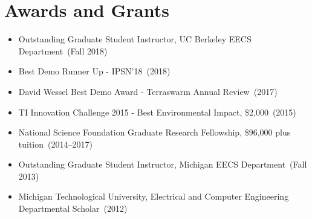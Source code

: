 \documentclass{article}
\begin{document}



\section*{Awards and Grants}
\vspace{-6pt}
\begin{itemize}
  \item[] Outstanding Graduate Student Instructor, UC Berkeley EECS Department~(Fall 2018)
  \item[] Best Demo Runner Up - IPSN'18~(2018)
  \item[] David Wessel Best Demo Award - Terraswarm Annual Review~(2017)
  \item[] TI Innovation Challenge 2015 - Best Environmental Impact, \$2,000~(2015)
  \item[] National Science Foundation Graduate Research Fellowship, \$96,000 plus tuition~(2014--2017)
  \item[] Outstanding Graduate Student Instructor, Michigan EECS Department~(Fall 2013)
  \item[] Michigan Technological University, Electrical and Computer Engineering Departmental Scholar~(2012)
\end{itemize}
\end{document}
